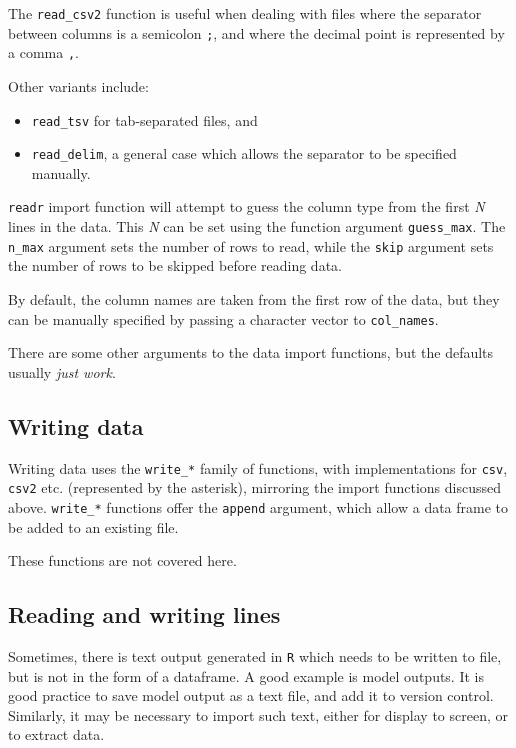 \documentclass[
]{book}
\begin{document}
The \texttt{read\_csv2} function is useful when dealing with files where the separator between columns is a semicolon \texttt{;}, and where the decimal point is represented by a comma \texttt{,}.

Other variants include:

\begin{itemize}
\item
  \texttt{read\_tsv} for tab-separated files, and
\item
  \texttt{read\_delim}, a general case which allows the separator to be specified manually.
\end{itemize}

\texttt{readr} import function will attempt to guess the column type from the first \emph{N} lines in the data. This \emph{N} can be set using the function argument \texttt{guess\_max}. The \texttt{n\_max} argument sets the number of rows to read, while the \texttt{skip} argument sets the number of rows to be skipped before reading data.

By default, the column names are taken from the first row of the data, but they can be manually specified by passing a character vector to \texttt{col\_names}.

There are some other arguments to the data import functions, but the defaults usually \emph{just work}.

\hypertarget{writing-data}{%
\subsection{Writing data}\label{writing-data}}

Writing data uses the \texttt{write\_*} family of functions, with implementations for \texttt{csv}, \texttt{csv2} etc. (represented by the asterisk), mirroring the import functions discussed above. \texttt{write\_*} functions offer the \texttt{append} argument, which allow a data frame to be added to an existing file.

These functions are not covered here.

\hypertarget{reading-and-writing-lines}{%
\subsection{Reading and writing lines}\label{reading-and-writing-lines}}

Sometimes, there is text output generated in \texttt{R} which needs to be written to file, but is not in the form of a dataframe. A good example is model outputs. It is good practice to save model output as a text file, and add it to version control.
Similarly, it may be necessary to import such text, either for display to screen, or to extract data.
\end{document}
